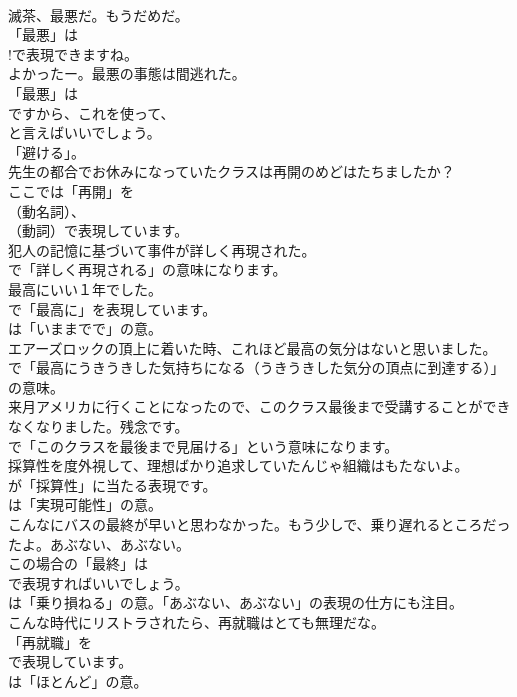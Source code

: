 \documentclass[8pt]{extreport}
\begin{document}
\begin{CJK}{UTF8}{min}
\\	滅茶、最悪だ。もうだめだ。 
\\	「最悪」は
\\	!で表現できますね。	
\\	よかったー。最悪の事態は間逃れた。 
\\	「最悪」は
\\	ですから、これを使って、
\\	と言えばいいでしょう。
\\	「避ける」。	
\\	先生の都合でお休みになっていたクラスは再開のめどはたちましたか？ 
\\	ここでは「再開」を 
\\	（動名詞）、
\\	（動詞）で表現しています。	
\\	犯人の記憶に基づいて事件が詳しく再現された。 
\\	で「詳しく再現される」の意味になります。	
\\	最高にいい１年でした。 
\\	で「最高に」を表現しています。
\\	は「いままでで」の意。	
\\	エアーズロックの頂上に着いた時、これほど最高の気分はないと思いました。 
\\	で「最高にうきうきした気持ちになる（うきうきした気分の頂点に到達する）」の意味。	
\\	来月アメリカに行くことになったので、このクラス最後まで受講することができなくなりました。残念です。 
\\	で「このクラスを最後まで見届ける」という意味になります。	
\\	採算性を度外視して、理想ばかり追求していたんじゃ組織はもたないよ。 
\\	が「採算性」に当たる表現です。
\\	は「実現可能性」の意。	
\\	こんなにバスの最終が早いと思わなかった。もう少しで、乗り遅れるところだったよ。あぶない、あぶない。 
\\	この場合の「最終」は 
\\	で表現すればいいでしょう。
\\	は「乗り損ねる」の意。「あぶない、あぶない」の表現の仕方にも注目。	
\\	こんな時代にリストラされたら、再就職はとても無理だな。 
\\	「再就職」を 
\\	で表現しています。
\\	は「ほとんど」の意。	

\end{CJK}
\end{document}
